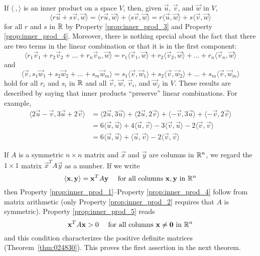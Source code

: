\documentclass{ximera}
\begin{document}
If $\langle\ , \rangle$ is an inner product on a space $V$, then, given $\vec{u}$, $\vec{v}$, and $\vec{w}$ in $V$,
\begin{equation*}
\langle r\vec{u} + s\vec{v}, \vec{w} \rangle = \langle r\vec{u}, \vec{w} \rangle + \langle s\vec{v}, \vec{w} \rangle = r\langle \vec{u}, \vec{w} \rangle + s\langle \vec{v}, \vec{w} \rangle
\end{equation*}
for all $r$ and $s$ in $\mathbb{R}$ by  Property \ref{prop:inner_prod_3} and Property \ref{prop:inner_prod_4}. Moreover, there is nothing special about the fact that there are two terms in the linear combination or that it is in the first component:
\begin{equation*}
\langle r_1\vec{v}_1 + r_2\vec{v}_2 + \dots + r_n\vec{v}_n, \vec{w} \rangle =
r_1\langle \vec{v}_1, \vec{w} \rangle +
r_2\langle \vec{v}_2, \vec{w} \rangle + \dots +
r_n\langle \vec{v}_n, \vec{w} \rangle
\end{equation*}
and
\begin{equation*}
\langle \vec{v}, s_1\vec{w}_1 + s_2\vec{w}_2 + \dots + s_m\vec{w}_m \rangle =
s_1\langle \vec{v}, \vec{w}_1 \rangle +
s_2\langle \vec{v}, \vec{w}_2 \rangle + \dots +
s_m\langle \vec{v}, \vec{w}_m \rangle
\end{equation*}
hold for all $r_{i}$ and $s_{i}$ in $\mathbb{R}$ and all $\vec{v}$, $\vec{w}$, $\vec{v}_{i}$, and $\vec{w}_{j}$ in $V$. These results are described by saying that inner products ``preserve'' linear combinations. For example,
\begin{align*}
\langle 2\vec{u} - \vec{v}, 3\vec{u} + 2\vec{v} \rangle &=
\langle 2\vec{u}, 3\vec{u} \rangle + \langle 2\vec{u}, 2\vec{v} \rangle + \langle -\vec{v}, 3\vec{u} \rangle + \langle -\vec{v}, 2\vec{v} \rangle \\
&= 6 \langle \vec{u}, \vec{u} \rangle + 4 \langle \vec{u}, \vec{v} \rangle -3 \langle \vec{v}, \vec{u} \rangle - 2 \langle \vec{v}, \vec{v} \rangle \\
&= 6 \langle \vec{u}, \vec{u} \rangle + \langle \vec{u}, \vec{v} \rangle - 2 \langle \vec{v}, \vec{v} \rangle
\end{align*}

If $A$ is a symmetric $n \times n$ matrix and $\vec{x}$ and $\vec{y}$ are columns in $\mathbb{R}^n$, we regard the $1 \times 1$ matrix $\vec{x}^{T}A\vec{y}$ as a number. If we write
\begin{equation*}
\langle \mathbf{x}, \mathbf{y} \rangle = \mathbf{x}^TA\mathbf{y} \quad \mbox{ for all columns } \mathbf{x}, \mathbf{y} \mbox{ in } \mathbb{R}^n
\end{equation*}
then  Property \ref{prop:inner_prod_1}--Property \ref{prop:inner_prod_4} follow from matrix arithmetic (only Property \ref{prop:inner_prod_2} requires that $A$ is symmetric).  Property \ref{prop:inner_prod_5} reads
\begin{equation*}
\mathbf{x}^TA \mathbf{x} > 0 \quad \mbox{ for all columns } \mathbf{x} \neq \mathbf{0} \mbox{ in } \mathbb{R}^n
\end{equation*}
and this condition characterizes the positive definite matrices  (Theorem~\ref{thm:024830}). This proves the first assertion in the next theorem.
\end{document}
